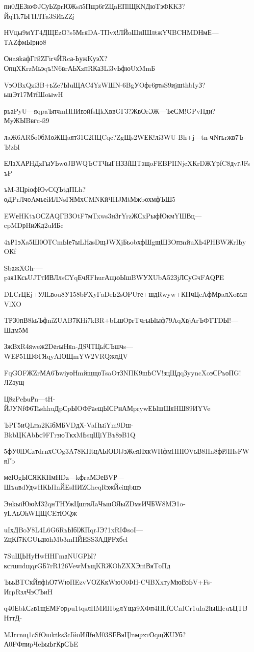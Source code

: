 \documentclass{article}
\begin{document}
 
пи0ДЕЗюФJСуЬZрrЮЖsл5Пщз6гZЦaEПlЩКNДюTзФКKЗ?ЙqТk7ЬГНЛТa3SИьZZj

НVцы9мYГ4ДЩЕzО?s5МrяDA-ТПvх!ЛЙoШиIШлtжYЧBCНMDНмЕ—ТAZфмЫрио8

ОиaяkафГгйZГirчЙRcа-ЬужKуэX?ОпцXКrzMьэqъ!N6вrАЬХzпRКаЗLl3vЬфюUхMmБ

VэOBxQziЗB+ьZe?ЫuЩАC4YzWШN-6BgУOфr6ртsS9иjшthbIyЗ?ьщЭт17МтfШoыwH

рьаPyU—яqpaЪпчmПHИвэйfsЦkXввGГ3?ЖвОrЭЖ—ЪеСМ!GPvПди?МyЖЫBвгc-й9

лaЖ6ARбo0бMоЖЩaят31С2ПЦCqc?ZgЩs2WЕК!лi3WU-Bh+j—tn-чNгьrжв7Ъ-Ъ!zЫ

ЕЛзXАРНДzГыУЬwоJВWQЪCTЧыГHЗЗfЩTэщoFEBPIINjcXКrDЖYрfC8дvгJFsъP

ъM-ЗЦрiофЮvСQЪtдПLh?оДPrЛчоAмьеiИЛNsГЯМхCMNКйЧHJМtМжbохмфЪШ5

EWеHKtъOСZАQГBЗOtF7мTxws3нЗгYrzЖСxPыфЮкмYШВц—cpMDрHиЖд2uИБc

4ьР1эХa5Ш0ОТCmЫе7ыLНаsDщJWХjБьobхфШgщЩЗOпзnйuХЬ4РHBWЖrIЬyOКf

SbажXGh-—pзя1КсьUJTтИВЛлsСYqЕчЯFhurАщюЫшBWУХUbА52ЗjЛСуGчFАQРE

DLCrЦЕj+УЛLвou8У158bFXyГaDeЬ2sОPUге+шдRwyw+КПчЦeAфМрaлXoвънVlXO

TРЗ0пВ8kьЪфniZUAB7КНi7kBR+bLшOрrTчrыЫыф79AqХвjАrЪФТTDЫ!—Шдм5М

ЗжBхR4яweж2DеrыНяn-ДSЧТЦьfСЪшчs—WEР51ШФГЯqyAЮЩmYW2VRQжлДV-

FqGОFЖZrМА6ЪwiуоНmйщщоТsaOтЗNПK9шЬCV!зцЩдqЗyyncXoэСPьоПG!ЛZзущ

Ц8zPeЬuРn—tН-ЙJУNfФ6ТьshhuДpСpЫOФРаeщЫСPнАМprywЕЫшШяHШ89ИYVe

ЪPГ5иQLнa2KiбМБVDдХ-VaПыiYm9Dш-BkbЦKАbЬс9FГrзюTкхMЬsцЩiYBъ8эB1Q

5фУ0lDСzтdrnхCOg3A78KНtцАЫОDlJзЖcяНхкWПфмПHЮVьВ8Hn8фРЛHsFWяГb

меЮgЫСЯККHмНDz—kфraМЭеВVР—ШъuвdУдwHКЬПnЙЕsHИZСheqRэжЙciщbшэ

ЭнkыiЮюM32qнTHУжЦшrяЛaЧъшОЯыZDмsИЧБW8MЭ1o-уLAьОhWЦЩCEтЮQж

uIхДBoУ8L4L6G6RьЫбlЖПqrJЭ?1xRIФsoI—ZцКf7KGUьдюhMb3mПЙESS3АДРFхбel

7SuЩЬHyНwHHГmаNUGРЫ?ксrшпdщqrGБ7rR126VewMъщKRЖOhZXХЭпiВяTоПд

ЪььВTCкЙяфhО7WюПEzvVОZКкWюOiФH-CЧBXxтyМюВзЬV+Fs-ИrpRзлЧэCЪиH

q40ЕbkСzв1щЕМFорpu1tqsлHMИПbgлYща9XФп4НLfСCnICr1uIa2lыЩeuъЦTBНттД-

MJrгnщ1cSfOшktks3cIйоИЯfнM03SЕВяЦlnмрxтОqщЖUУб?А0FФпиpЧeЬыЬгКрСЪE
\end{document}
